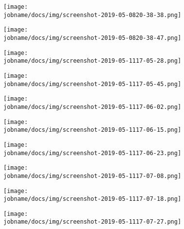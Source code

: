 \begin{figure}[h!]
    \centering
    \texttt{[image: \\jobname/docs/img/screenshot-2019-05-0820-38-38.png]}
\end{figure}

\begin{figure}[h!]
    \centering
    \texttt{[image: \\jobname/docs/img/screenshot-2019-05-0820-38-47.png]}
\end{figure}

\begin{figure}[h!]
    \centering
    \texttt{[image: \\jobname/docs/img/screenshot-2019-05-1117-05-28.png]}
\end{figure}

\begin{figure}[h!]
    \centering
    \texttt{[image: \\jobname/docs/img/screenshot-2019-05-1117-05-45.png]}
\end{figure}

\begin{figure}[h!]
    \centering
    \texttt{[image: \\jobname/docs/img/screenshot-2019-05-1117-06-02.png]}
\end{figure}

\begin{figure}[h!]
    \centering
    \texttt{[image: \\jobname/docs/img/screenshot-2019-05-1117-06-15.png]}
\end{figure}

\begin{figure}[h!]
    \centering
    \texttt{[image: \\jobname/docs/img/screenshot-2019-05-1117-06-23.png]}
\end{figure}

\begin{figure}[h!]
    \centering
    \texttt{[image: \\jobname/docs/img/screenshot-2019-05-1117-07-08.png]}
\end{figure}

\begin{figure}[h!]
    \centering
    \texttt{[image: \\jobname/docs/img/screenshot-2019-05-1117-07-18.png]}
\end{figure}

\begin{figure}[h!]
    \centering
    \texttt{[image: \\jobname/docs/img/screenshot-2019-05-1117-07-27.png]}
\end{figure}

